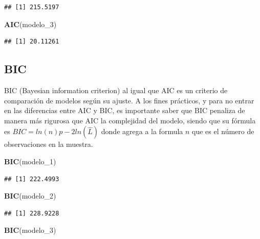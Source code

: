 \documentclass[]{book}
\newenvironment{Shaded}{\begin{snugshade}}{\end{snugshade}}
\newcommand{\KeywordTok}[1]{\textcolor[rgb]{0.13,0.29,0.53}{\textbf{#1}}}
\newcommand{\DecValTok}[1]{\textcolor[rgb]{0.00,0.00,0.81}{#1}}
\newcommand{\NormalTok}[1]{#1}
\begin{document}
\begin{verbatim}
## [1] 215.5197
\end{verbatim}

\begin{Shaded}
\begin{Highlighting}[]
\KeywordTok{AIC}\NormalTok{(modelo_}\DecValTok{3}\NormalTok{)}
\end{Highlighting}
\end{Shaded}

\begin{verbatim}
## [1] 20.11261
\end{verbatim}

\subsection{BIC}\label{bic}

BIC (Bayesian information criterion) al igual que AIC es un criterio de
comparación de modelos según su ajuste. A los fines prácticos, y para no
entrar en las diferencias entre AIC y BIC, es importante saber que BIC
penaliza de manera más rigurosa que AIC la complejidad del modelo,
siendo que su fórmula es \(BIC=ln(n)p-2ln(\hat {L})\) donde agrega a la
formula \(n\) que es el número de observaciones en la muestra.

\begin{Shaded}
\begin{Highlighting}[]
\KeywordTok{BIC}\NormalTok{(modelo_}\DecValTok{1}\NormalTok{)}
\end{Highlighting}
\end{Shaded}

\begin{verbatim}
## [1] 222.4993
\end{verbatim}

\begin{Shaded}
\begin{Highlighting}[]
\KeywordTok{BIC}\NormalTok{(modelo_}\DecValTok{2}\NormalTok{)}
\end{Highlighting}
\end{Shaded}

\begin{verbatim}
## [1] 228.9228
\end{verbatim}

\begin{Shaded}
\begin{Highlighting}[]
\KeywordTok{BIC}\NormalTok{(modelo_}\DecValTok{3}\NormalTok{)}
\end{Highlighting}
\end{Shaded}
\end{document}

